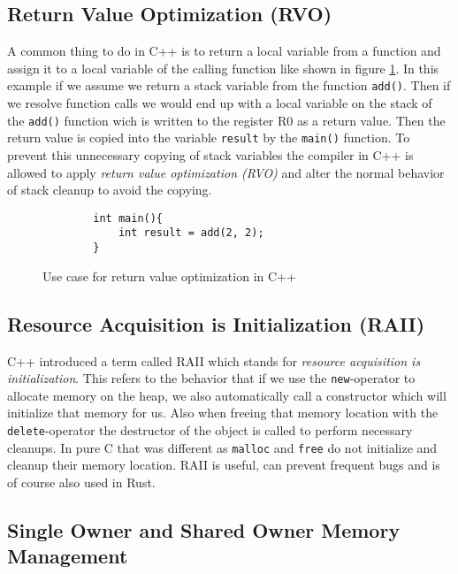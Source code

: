             \subsection{Return Value Optimization (RVO)}

            A common thing to do in C++ is to return a local variable from a function and assign it to a local variable of the calling function like shown in figure \ref{fig:rvo}. In this example if we assume we return a stack variable from the function \lstinline{add()}. Then if we resolve function calls we would end up with a local variable on the stack of the \lstinline{add()} function wich is written to the register R0 as a return value. Then the return value is copied into the variable \lstinline{result} by the \lstinline{main()} function. To prevent this unnecessary copying of stack variables the compiler in C++ is allowed to apply \textit{return value optimization (RVO)} and alter the normal behavior of stack cleanup to avoid the copying.

    \begin{figure}[h]
        \begin{lstlisting}
        int main(){
            int result = add(2, 2);
        }
    \end{lstlisting}
        \caption{Use case for return value optimization in C++}
        \label{fig:rvo}
    \end{figure}

    \subsection{Resource Acquisition is Initialization (RAII)}

    C++ introduced a term called RAII which stands for \textit{resource acquisition is initialization}. This refers to the behavior that if we use the \lstinline{new}-operator to allocate memory on the heap, we also automatically call a constructor which will initialize that memory for us. Also when freeing that memory location with the \lstinline{delete}-operator the destructor of the object is called to perform necessary cleanups. In pure C that was different as \lstinline{malloc} and \lstinline{free} do not initialize and cleanup their memory location. RAII is useful, can prevent frequent bugs and is of course also used in Rust.

    \subsection{Single Owner and Shared Owner Memory Management}

